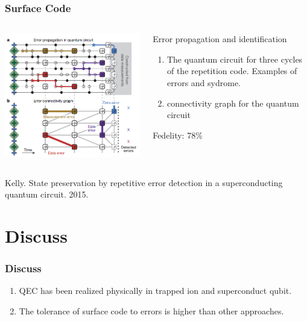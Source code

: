 \documentclass[aspectratio=169,10pt]{beamer}
\begin{document}
\begin{frame}
    \frametitle{Surface Code}
    \begin{columns}
        \begin{column}{0.5\textwidth}
            \centering
            \includegraphics[width=\columnwidth]{figure/surface3.png}
        \end{column}
        \begin{column}{0.5\textwidth}
            \centering
            \begin{block}{Error propagation and identification}
                \begin{enumerate}
                    \item The quantum circuit for three cycles of the repetition code. Examples of errors and sydrome.
                    \item connectivity graph for the quantum circuit
                \end{enumerate}
            \end{block}
            Fedelity: 78\%
        \end{column}
    \end{columns}
\tiny{Kelly. State preservation by repetitive error detection in a superconducting quantum circuit. 2015.}
\end{frame}


\section{Discuss}
\begin{frame}
    \frametitle{Discuss}
    \begin{enumerate}
        \item QEC has been realized physically in trapped ion and superconduct qubit.
        \item The tolerance of surface code to errors is higher than other approaches.
    \end{enumerate}
\end{frame}

\begin{frame}[noframenumbering]
\end{frame}
\end{document}
